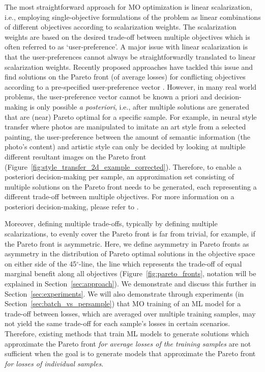 The most straightforward approach for MO optimization is linear scalarization, i.e., employing single-objective formulations of the problem as linear combinations of different objectives according to scalarization weights. The scalarization weights are based on the desired trade-off between multiple objectives which is often referred to as `user-preference'. A major issue with linear scalarization is that the user-preferences cannot always be straightforwardly translated to linear scalarization weights. Recently proposed approaches have tackled this issue and find solutions on the Pareto front (of average losses) for conflicting objectives according to a pre-specified user-preference vector \citep{lin2019paretomtl, mahapatra2020multi}. However, in many real world problems, the user-preference vector cannot be known a priori and decision-making is only possible \emph{a posteriori}, i.e., after multiple solutions are generated that are (near) Pareto optimal for a specific sample. For example, in neural style transfer \citep{gatys2016image} where photos are manipulated to imitate an art style from a selected painting, the user-preference between the amount of semantic information (the photo's content) and artistic style can only be decided by looking at multiple different resultant images on the Pareto front (Figure~\ref{fig:style_transfer_2d_example_corrected}). Therefore, to enable a posteriori decision-making per sample, an approximation set consisting of multiple solutions on the Pareto front needs to be generated, each representing a different trade-off between multiple objectives. For more information on a posteriori decision-making, please refer to \cite{hwang2012multiple}. 

Moreover, defining multiple trade-offs, typically by defining multiple scalarizations, to evenly cover the Pareto front is far from trivial, for example, if the Pareto front is asymmetric. Here, we define asymmetry in Pareto fronts as asymmetry in the distribution of Pareto optimal solutions in the objective space on either side of the 45$^{\circ}$-line, the line which represents the trade-off of equal marginal benefit along all objectives (Figure~\ref{fig:pareto_fronts}, notation will be explained in Section~\ref{sec:approach}). We demonstrate and discuss this further in Section~\ref{sec:experiments}. We will also demonstrate through experiments (in Section~\ref{sec:batch_vs_persample}) that MO training of an ML model for a trade-off between losses, which are averaged over multiple training samples, may not yield the same trade-off for each sample's losses in certain scenarios. Therefore, existing methods that train ML models to generate solutions which approximate the Pareto front \emph{for average losses of the training samples} are not sufficient when the goal is to generate models that approximate the Pareto front \emph{for losses of individual samples}.

